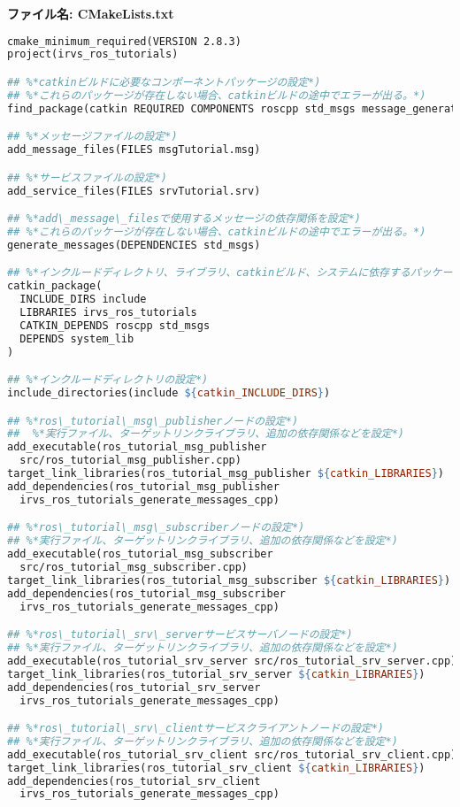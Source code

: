 \noindent\textbf{ファイル名: CMakeLists.txt}
\begin{lstlisting}[language=make]
cmake_minimum_required(VERSION 2.8.3)
project(irvs_ros_tutorials)

## %*catkinビルドに必要なコンポーネントパッケージの設定*)
## %*これらのパッケージが存在しない場合、catkinビルドの途中でエラーが出る。*)
find_package(catkin REQUIRED COMPONENTS roscpp std_msgs message_generation)

## %*メッセージファイルの設定*)
add_message_files(FILES msgTutorial.msg)

## %*サービスファイルの設定*)
add_service_files(FILES srvTutorial.srv)

## %*add\_message\_filesで使用するメッセージの依存関係を設定*)
## %*これらのパッケージが存在しない場合、catkinビルドの途中でエラーが出る。*)
generate_messages(DEPENDENCIES std_msgs)

## %*インクルードディレクトリ、ライブラリ、catkinビルド、システムに依存するパッケージの指定*)
catkin_package(
  INCLUDE_DIRS include
  LIBRARIES irvs_ros_tutorials
  CATKIN_DEPENDS roscpp std_msgs
  DEPENDS system_lib
)

## %*インクルードディレクトリの設定*)
include_directories(include ${catkin_INCLUDE_DIRS})

## %*ros\_tutorial\_msg\_publisherノードの設定*)
##  %*実行ファイル、ターゲットリンクライブラリ、追加の依存関係などを設定*)
add_executable(ros_tutorial_msg_publisher
  src/ros_tutorial_msg_publisher.cpp)
target_link_libraries(ros_tutorial_msg_publisher ${catkin_LIBRARIES})
add_dependencies(ros_tutorial_msg_publisher
  irvs_ros_tutorials_generate_messages_cpp)

## %*ros\_tutorial\_msg\_subscriberノードの設定*)
## %*実行ファイル、ターゲットリンクライブラリ、追加の依存関係などを設定*)
add_executable(ros_tutorial_msg_subscriber
  src/ros_tutorial_msg_subscriber.cpp)
target_link_libraries(ros_tutorial_msg_subscriber ${catkin_LIBRARIES})
add_dependencies(ros_tutorial_msg_subscriber
  irvs_ros_tutorials_generate_messages_cpp)

## %*ros\_tutorial\_srv\_serverサービスサーバノードの設定*)
## %*実行ファイル、ターゲットリンクライブラリ、追加の依存関係などを設定*)
add_executable(ros_tutorial_srv_server src/ros_tutorial_srv_server.cpp)
target_link_libraries(ros_tutorial_srv_server ${catkin_LIBRARIES})
add_dependencies(ros_tutorial_srv_server
  irvs_ros_tutorials_generate_messages_cpp)

## %*ros\_tutorial\_srv\_clientサービスクライアントノードの設定*)
## %*実行ファイル、ターゲットリンクライブラリ、追加の依存関係などを設定*)
add_executable(ros_tutorial_srv_client src/ros_tutorial_srv_client.cpp)
target_link_libraries(ros_tutorial_srv_client ${catkin_LIBRARIES})
add_dependencies(ros_tutorial_srv_client
  irvs_ros_tutorials_generate_messages_cpp)
\end{lstlisting}

